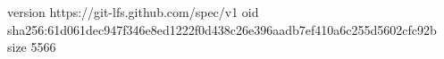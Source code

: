 version https://git-lfs.github.com/spec/v1
oid sha256:61d061dec947f346e8ed1222f0d438c26e396aadb7ef410a6c255d5602cfc92b
size 5566
